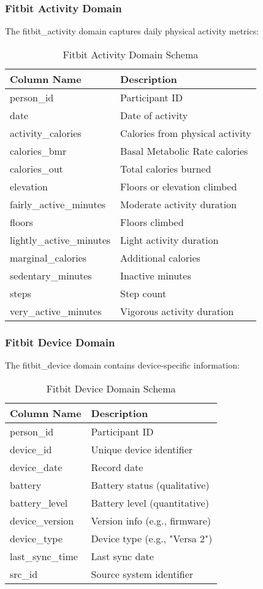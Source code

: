 \documentclass[12pt]{article}
\begin{document}
\subsubsection{Fitbit Activity Domain}
The fitbit\_activity domain captures daily physical activity metrics:
\begin{table}[h]
\centering
\begin{tabular}{|l|l|}
\hline
\textbf{Column Name} & \textbf{Description} \\
\hline
person\_id & Participant ID \\
date & Date of activity \\
activity\_calories & Calories from physical activity \\
calories\_bmr & Basal Metabolic Rate calories \\
calories\_out & Total calories burned \\
elevation & Floors or elevation climbed \\
fairly\_active\_minutes & Moderate activity duration \\
floors & Floors climbed \\
lightly\_active\_minutes & Light activity duration \\
marginal\_calories & Additional calories \\
sedentary\_minutes & Inactive minutes \\
steps & Step count \\
very\_active\_minutes & Vigorous activity duration \\
\hline
\end{tabular}
\caption{Fitbit Activity Domain Schema}
\end{table}

\subsubsection{Fitbit Device Domain}
The fitbit\_device domain contains device-specific information:
\begin{table}[h]
\centering
\begin{tabular}{|l|l|}
\hline
\textbf{Column Name} & \textbf{Description} \\
\hline
person\_id & Participant ID \\
device\_id & Unique device identifier \\
device\_date & Record date \\
battery & Battery status (qualitative) \\
battery\_level & Battery level (quantitative) \\
device\_version & Version info (e.g., firmware) \\
device\_type & Device type (e.g., "Versa 2") \\
last\_sync\_time & Last sync date \\
src\_id & Source system identifier \\
\hline
\end{tabular}
\caption{Fitbit Device Domain Schema}
\end{table}
\end{document}
